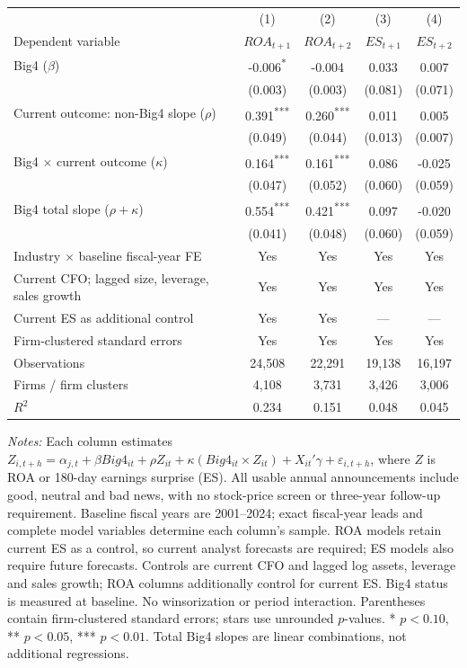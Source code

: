 \documentclass[10pt]{article}
\newcommand{\sym}[1]{\textsuperscript{#1}}
\begin{document}
\begin{minipage}{19cm}\fontsize{10}{12}\selectfont\centering
\setlength{\tabcolsep}{4pt}\renewcommand{\arraystretch}{1.15}
\begin{tabular*}{\textwidth}{@{\extracolsep{\fill}}lcccc@{}}\toprule
 & (1) & (2) & (3) & (4) \\
Dependent variable & $ROA_{t+1}$ & $ROA_{t+2}$ & $ES_{t+1}$ & $ES_{t+2}$ \\
\midrule
Big4 ($\beta$) & -0.006\sym{*} & -0.004\sym{} & 0.033\sym{} & 0.007\sym{} \\
 & (0.003) & (0.003) & (0.081) & (0.071) \\
Current outcome: non-Big4 slope ($\rho$) & 0.391\sym{***} & 0.260\sym{***} & 0.011\sym{} & 0.005\sym{} \\
 & (0.049) & (0.044) & (0.013) & (0.007) \\
Big4 $\times$ current outcome ($\kappa$) & 0.164\sym{***} & 0.161\sym{***} & 0.086\sym{} & -0.025\sym{} \\
 & (0.047) & (0.052) & (0.060) & (0.059) \\
Big4 total slope ($\rho+\kappa$) & 0.554\sym{***} & 0.421\sym{***} & 0.097\sym{} & -0.020\sym{} \\
 & (0.041) & (0.048) & (0.060) & (0.059) \\
\addlinespace
Industry $\times$ baseline fiscal-year FE & Yes & Yes & Yes & Yes \\
Current CFO; lagged size, leverage, sales growth & Yes & Yes & Yes & Yes \\
Current ES as additional control & Yes & Yes & --- & --- \\
Firm-clustered standard errors & Yes & Yes & Yes & Yes \\
Observations & 24,508 & 22,291 & 19,138 & 16,197 \\
Firms / firm clusters & 4,108 & 3,731 & 3,426 & 3,006 \\
$R^2$ & 0.234 & 0.151 & 0.048 & 0.045 \\
\bottomrule\end{tabular*}
\par\medskip\raggedright\fontsize{9}{11}\selectfont
\textit{Notes:} Each column estimates $Z_{i,t+h}=\alpha_{j,t}+\beta Big4_{it}+\rho Z_{it}+\kappa(Big4_{it}\times Z_{it})+X_{it}'\gamma+\varepsilon_{i,t+h}$, where $Z$ is ROA or 180-day earnings surprise (ES). All usable annual announcements include good, neutral and bad news, with no stock-price screen or three-year follow-up requirement. Baseline fiscal years are 2001--2024; exact fiscal-year leads and complete model variables determine each column's sample. ROA models retain current ES as a control, so current analyst forecasts are required; ES models also require future forecasts. Controls are current CFO and lagged log assets, leverage and sales growth; ROA columns additionally control for current ES. Big4 status is measured at baseline. No winsorization or period interaction. Parentheses contain firm-clustered standard errors; stars use unrounded $p$-values. * $p<0.10$, ** $p<0.05$, *** $p<0.01$. Total Big4 slopes are linear combinations, not additional regressions.

\end{minipage}
\end{document}
